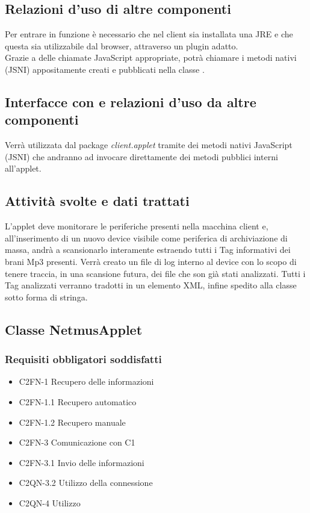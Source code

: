 \subsection*{Relazioni d'uso di altre componenti}
Per entrare in funzione \`e necessario che nel client sia installata una JRE e
che questa sia utilizzabile dal browser, attraverso un plugin adatto.\\
Grazie a delle chiamate JavaScript appropriate, potr\`a chiamare i metodi nativi
(JSNI) appositamente creati e pubblicati nella classe .
\subsection*{Interfacce con e relazioni d'uso da altre componenti}
Verr\`a utilizzata dal package \emph{client.applet} tramite dei metodi nativi
JavaScript (JSNI) che andranno ad invocare direttamente dei metodi pubblici
interni  all'applet.
\subsection*{Attivit\`a svolte e dati trattati}
L'applet deve monitorare le periferiche presenti nella macchina client e,
all'inserimento di un nuovo device visibile come periferica di archiviazione di
massa, andr\`a a scansionarlo interamente estraendo tutti i Tag informativi dei
brani Mp3 presenti. Verr\`a creato un file di log interno al device con lo scopo
di tenere traccia, in una scansione futura, dei file che son gi\`a stati
analizzati. Tutti i Tag analizzati verranno tradotti in un elemento XML, infine
spedito alla classe  sotto forma di stringa.\\

\subsection{Classe NetmusApplet}
\subsubsection*{Requisiti obbligatori soddisfatti}
\begin{itemize}
   \item C2FN-1 Recupero delle informazioni
   \item C2FN-1.1 Recupero automatico
   \item C2FN-1.2 Recupero manuale
   \item C2FN-3 Comunicazione con C1
   \item C2FN-3.1 Invio delle informazioni
   \item C2QN-3.2 Utilizzo della connessione
   \item C2QN-4 Utilizzo
\end{itemize}
